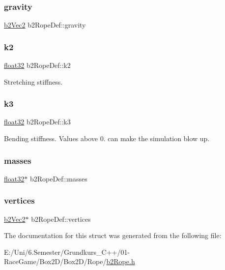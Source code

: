 \subsubsection{\texorpdfstring{gravity}{gravity}}
{\footnotesize\ttfamily \mbox{\hyperlink{structb2_vec2}{b2\+Vec2}} b2\+Rope\+Def\+::gravity}

\mbox{\label{structb2_rope_def_a89de5d2c15afacd41722c76523e33826}} 
\subsubsection{\texorpdfstring{k2}{k2}}
{\footnotesize\ttfamily \mbox{\hyperlink{b2_settings_8h_aacdc525d6f7bddb3ae95d5c311bd06a1}{float32}} b2\+Rope\+Def\+::k2}



Stretching stiffness. 

\mbox{\label{structb2_rope_def_a3f4749e0a309b53daf804c75adfb4ba8}} 
\subsubsection{\texorpdfstring{k3}{k3}}
{\footnotesize\ttfamily \mbox{\hyperlink{b2_settings_8h_aacdc525d6f7bddb3ae95d5c311bd06a1}{float32}} b2\+Rope\+Def\+::k3}



Bending stiffness. Values above 0. can make the simulation blow up. 

\mbox{\label{structb2_rope_def_a78f75cce30ee253062ffa6f5462b36a1}} 
\subsubsection{\texorpdfstring{masses}{masses}}
{\footnotesize\ttfamily \mbox{\hyperlink{b2_settings_8h_aacdc525d6f7bddb3ae95d5c311bd06a1}{float32}}$\ast$ b2\+Rope\+Def\+::masses}

\mbox{\label{structb2_rope_def_ae18ad98b9796c505ae62ce58fa2f7051}} 
\subsubsection{\texorpdfstring{vertices}{vertices}}
{\footnotesize\ttfamily \mbox{\hyperlink{structb2_vec2}{b2\+Vec2}}$\ast$ b2\+Rope\+Def\+::vertices}



The documentation for this struct was generated from the following file\+:\begin{DoxyCompactItemize}
\item 
E\+:/\+Uni/6.\+Semester/\+Grundkurs\+\_\+\+C++/01-\/\+Race\+Game/\+Box2\+D/\+Box2\+D/\+Rope/\mbox{\hyperlink{b2_rope_8h}{b2\+Rope.\+h}}\end{DoxyCompactItemize}
